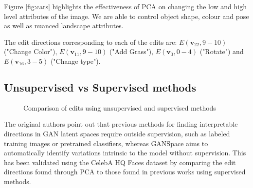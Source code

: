 Figure \ref{fig:cars} highlights the effectiveness of PCA on changing the low and high level attributes of the image. We are able to control object shape, colour and pose as well as nuanced landscape attributes.

The edit directions corresponding to each of the edits are: $E(\textbf{v}_{22}, 9-10)$ ("Change Color"), $E(\textbf{v}_{11}, 9-10)$ ("Add Grass"), $E(\textbf{v}_{0}, 0-4)$ ("Rotate") and $E(\textbf{v}_{16}, 3-5)$ ("Change type").

\subsection{Unsupervised vs Supervised methods}

\begin{figure}[H]



\caption{Comparison of edits using unsupervised and supervised methods}

\end{figure}

The original authors point out that previous methods for finding interpretable directions in GAN latent spaces require outside supervision, such as labeled training images or pretrained classifiers, whereas GANSpace aims to automatically identify variations intrinsic to the model without supervision. This has been validated using the CelebA HQ Faces dataset by comparing the edit directions found through PCA to those found in previous works using supervised methods.

